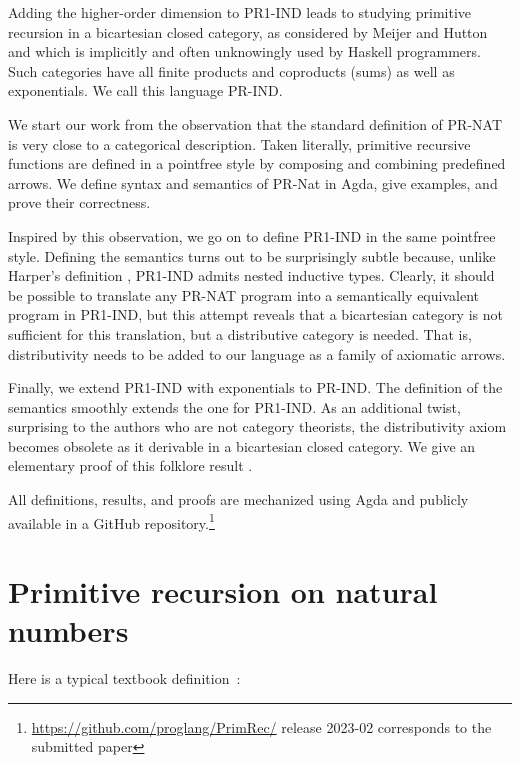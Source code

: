 \documentclass[a4paper,USenglish,cleveref, autoref, thm-restate]{lipics-v2021}
\begin{document}
Adding the higher-order dimension to PR1-IND leads to studying
primitive recursion in a bicartesian closed category, as considered
by Meijer and Hutton \cite{DBLP:conf/fpca/MeijerH95} and which is
implicitly and often unknowingly used by Haskell programmers. Such
categories have all finite products and coproducts (sums) as well as
exponentials. We call this language PR-IND.

We start our work from the observation that the standard definition of
PR-NAT is very close to a categorical description. Taken literally,
primitive recursive functions are defined in a pointfree style by
composing and combining predefined arrows. We define syntax and
semantics of PR-Nat in Agda, give examples, and prove their correctness.

Inspired by this observation, we go on to define PR1-IND in the same
pointfree style. Defining the semantics turns out to be surprisingly
subtle because, unlike Harper's definition \cite[Chapter
15]{DBLP:books/cu/Ha2016}, PR1-IND admits nested inductive types.
Clearly, it should be possible to translate any PR-NAT program into a
semantically equivalent program in PR1-IND, but this attempt reveals
that a bicartesian category is not sufficient for this translation,
but a distributive category is needed. That is, distributivity needs
to be added to our language as a family of axiomatic arrows.

Finally, we extend PR1-IND with exponentials to PR-IND. The definition
of the semantics smoothly extends the one for PR1-IND. As an
additional twist, surprising to the authors who are not category
theorists, the distributivity axiom becomes obsolete as it derivable in
a bicartesian closed category. We give an elementary proof of this
folklore result \cite{https://doi.org/10.48550/arxiv.1406.0961}. 

All definitions, results, and proofs are mechanized using Agda and
publicly available in a GitHub
repository.\footnote{\url{https://github.com/proglang/PrimRec/}
  release 2023-02 corresponds to the submitted paper} 

\section{Primitive recursion on natural numbers}
\label{sec:prim-recurs-natur}

Here is a typical textbook definition~\cite{martin2019logik,wiki:Primitive_recursive_function}:
\end{document}
